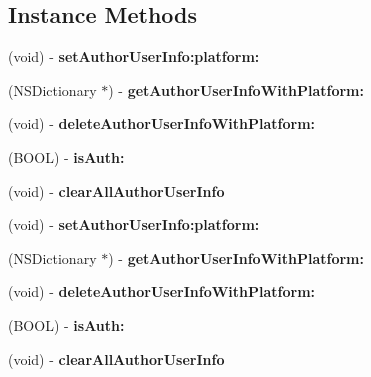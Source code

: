 \subsection*{Instance Methods}
\begin{DoxyCompactItemize}
\item 
\mbox{\label{interface_u_m_social_data_manager_afb9be73f9166777fce4d75f2db6a80bd}} 
(void) -\/ {\bfseries set\+Author\+User\+Info\+:platform\+:}
\item 
\mbox{\label{interface_u_m_social_data_manager_ab361d884dc059c8c0f94db181366e59e}} 
(N\+S\+Dictionary $\ast$) -\/ {\bfseries get\+Author\+User\+Info\+With\+Platform\+:}
\item 
\mbox{\label{interface_u_m_social_data_manager_aa0b99b35cae1f262d6de81ae4e8532d7}} 
(void) -\/ {\bfseries delete\+Author\+User\+Info\+With\+Platform\+:}
\item 
\mbox{\label{interface_u_m_social_data_manager_a91816c9d7b4349fd05ce12038a83ae6e}} 
(B\+O\+OL) -\/ {\bfseries is\+Auth\+:}
\item 
\mbox{\label{interface_u_m_social_data_manager_a751eefacc54eebde6e1118f3bcc1ffc3}} 
(void) -\/ {\bfseries clear\+All\+Author\+User\+Info}
\item 
\mbox{\label{interface_u_m_social_data_manager_afb9be73f9166777fce4d75f2db6a80bd}} 
(void) -\/ {\bfseries set\+Author\+User\+Info\+:platform\+:}
\item 
\mbox{\label{interface_u_m_social_data_manager_ab361d884dc059c8c0f94db181366e59e}} 
(N\+S\+Dictionary $\ast$) -\/ {\bfseries get\+Author\+User\+Info\+With\+Platform\+:}
\item 
\mbox{\label{interface_u_m_social_data_manager_aa0b99b35cae1f262d6de81ae4e8532d7}} 
(void) -\/ {\bfseries delete\+Author\+User\+Info\+With\+Platform\+:}
\item 
\mbox{\label{interface_u_m_social_data_manager_a91816c9d7b4349fd05ce12038a83ae6e}} 
(B\+O\+OL) -\/ {\bfseries is\+Auth\+:}
\item 
\mbox{\label{interface_u_m_social_data_manager_a751eefacc54eebde6e1118f3bcc1ffc3}} 
(void) -\/ {\bfseries clear\+All\+Author\+User\+Info}
\end{DoxyCompactItemize}
